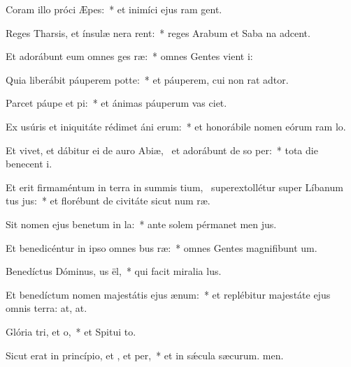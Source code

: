 \item Coram illo próci Æpes:~* et inimíci ejus ram gent.
\item Reges Tharsis, et ínsulæ nera rent:~* reges Arabum et Saba na adcent.
\item Et adorábunt eum omnes ges ræ:~* omnes Gentes vient i:
\item Quia liberábit páuperem  potte:~* et páuperem, cui non rat adtor.
\item Parcet páupe et pi:~* et ánimas páuperum vas ciet.
\item Ex usúris et iniquitáte rédimet áni erum:~* et honorábile nomen eórum ram lo.
\item Et vivet, et dábitur ei de auro Abiæ,~\pscross{} et adorábunt de so per:~* tota die benecent i.
\item Et erit firmaméntum in terra in summis tium,~\pscross{} superextollétur super Líbanum tus jus:~* et florébunt de civitáte sicut num ræ.
\item Sit nomen ejus benetum in la:~* ante solem pérmanet men jus.
\item Et benedicéntur in ipso omnes bus ræ:~* omnes Gentes magnifibunt um.
\item Benedíctus Dóminus, us ël,~* qui facit miralia lus.
\item Et benedíctum nomen majestátis ejus  ænum:~* et replébitur majestáte ejus omnis terra: at, at.
\item Glória tri, et o,~* et Spitui to.
\item Sicut erat in princípio, et , et per,~* et in sǽcula sæcurum. men.
